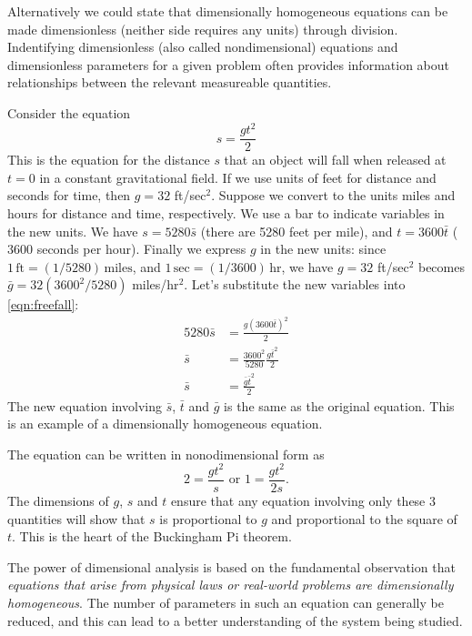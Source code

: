 Alternatively we could state that dimensionally homogeneous equations 
can be made dimensionless (neither side requires any units) through division.
Indentifying dimensionless (also called  nondimensional) equations 
and dimensionless parameters for a given problem often provides 
information about relationships between the relevant measureable quantities.
\begin{xexample}
Consider the equation
\begin{equation}
   s = \frac{gt^2}{2}
\label{eqn:freefall}
\end{equation}
This is the equation for the
distance $s$ that an object will fall when released
at $t=0$ in a constant gravitational field.
If we use units of feet for distance and seconds
for time, then $g=32$ ft/sec$^2$.
Suppose we convert to the units miles and hours
for distance and time, respectively.
We use a bar to indicate variables in the 
new units.  We have $s = 5280\bar{s}$ (there
are 5280 feet per mile), and $t = 3600\bar{t}$
($3600$ seconds per hour).
Finally we express $g$ in the new units:
since $1 \,\textrm{ft} = (1/5280) \,\textrm{miles}$, and
$1 \,\textrm{sec} = (1/3600) \,\textrm{hr}$, we have
$g = 32$ ft/sec$^2$ becomes $\bar{g} = 32 (3600^2/5280)$
miles/hr$^2$.
Let's substitute the new variables into
\eqref{eqn:freefall}:
\begin{equation}
\begin{split}
   5280\bar{s} & = \frac{g\left(3600\bar{t}\right)^2}{2} \\
   \bar{s} & = \frac{3600^2}{5280} \frac{g\bar{t}^2}{2} \\
   \bar{s} & = \frac{\bar{g}\bar{t}^2}{2}
\end{split}
\end{equation}
The new equation involving $\bar{s}$, $\bar{t}$ and $\bar{g}$
is the same as the original equation.
This is an example of a dimensionally homogeneous equation.

The equation can be written in nonodimensional form as 
\begin{equation}
  2= \frac{gt^2}{s} \mbox{ or } 1= \frac{gt^2}{2s}.
\end{equation}
The dimensions of $g$, $s$ and $t$ ensure that any equation involving only these 
3 quantities will show that $s$ is proportional to $g$ and proportional to the
square of $t$.  This is the heart of the Buckingham Pi theorem.
\end{xexample}

\medskip
The power of dimensional analysis is based on the
fundamental observation that
\emph{equations that arise from physical laws
or real-world problems are dimensionally homogeneous}.
The number of parameters in such an equation can generally
be reduced, and this can lead to a better understanding
of the system being studied.

